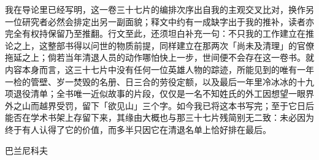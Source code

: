 我在导论里已经写明，这一卷三十七片的编排次序出自我的主观交叉比对，换作另一位研究者必然会排定出另一副面貌；释文中约有一成缺字出于我的推补，读者亦完全有权持保留乃至推翻。行文至此，还须坦白补充一句：不只我的工作建立在推论之上，这整部书得以问世的物质前提，同样建立在那两次「尚未及清理」的官僚拖延之上；倘若当年清退人员的动作哪怕快上一步，世间便不会存在这一卷书。就内容本身而言，这三十七片中没有任何一位英雄人物的踪迹，所能见到的唯有一年一检的管壁、岁一焚毁的名册、日三合的劳役定额，以及最后一年里冷冰冰的十九项退役清单；全书唯一近似故事的片段，仅仅是一名不知姓氏的外工因想望一眼界外之山而越界受罚，留下「欲见山」三个字。如今我已将这本书写完；至于它日后能否在学术书架上存留下来，其缘由大概也与那三十七片残简别无二致：未必因为终于有人认得了它的价值，而多半只因它在清退名单上恰好排在最后。

\begin{flushright}
{\small 巴兰尼科夫}
\end{flushright}
